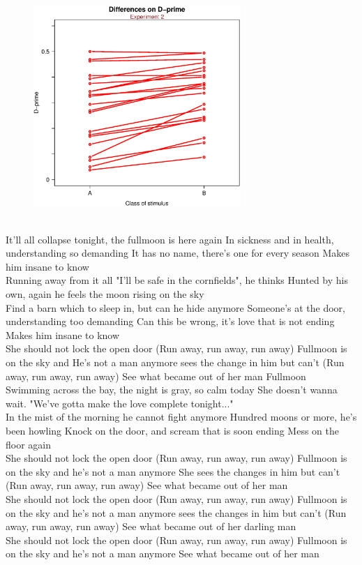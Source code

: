 \documentclass{sciposter}
\begin{document}
\begin{multicols}{3}
\begin{figure}
\centering
\includegraphics[width=0.7\textwidth]{Figures/Diff_Dprime.eps}
\end{figure}
\\
It'll all collapse tonight, the fullmoon is here again
In sickness and in health, understanding so demanding
It has no name, there's one for every season
Makes him insane to know
\\
Running away from it all
"I'll be safe in the cornfields", he thinks
Hunted by his own,
again he feels the moon rising on the sky
\\
Find a barn which to sleep in, but can he hide anymore
Someone's at the door, understanding too demanding
Can this be wrong, it's love that is not ending
Makes him insane to know
\\
She should not lock the open door
(Run away, run away, run away)
Fullmoon is on the sky and He's not a man anymore
sees the change in him but can't
(Run away, run away, run away)
See what became out of her man
Fullmoon
\\
Swimming across the bay,
the night is gray, so calm today
She doesn't wanna wait.
"We've gotta make the love complete tonight..."
\\
In the mist of the morning he cannot fight anymore
Hundred moons or more, he's been howling
Knock on the door, and scream that is soon ending
Mess on the floor again
\\
She should not lock the open door
(Run away, run away, run away)
Fullmoon is on the sky and he's not a man anymore
She sees the changes in him but can't
(Run away, run away, run away)
See what became out of her man
\\
She should not lock the open door
(Run away, run away, run away)
Fullmoon is on the sky and he's not a man anymore
sees the changes in him but can't
(Run away, run away, run away)
See what became out of her darling man
\\
She should not lock the open door
(Run away, run away, run away)
Fullmoon is on the sky and he's not a man anymore
See what became out of her man
 

\end{multicols}
\end{document}
